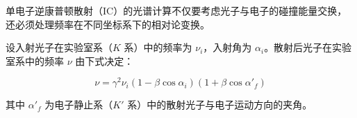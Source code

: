 单电子逆康普顿散射（IC）的光谱计算不仅要考虑光子与电子的碰撞能量交换，还必须处理频率在不同坐标系下的相对论变换。

\begin{theorem}[逆康普顿散射频率变换]
设入射光子在实验室系（$K$ 系）中的频率为 $\nu_i$，入射角为 $\alpha_i$。散射后光子在实验室系中的频率 $\nu$ 由下式决定：
\begin{tcolorbox}[colframe=black, colback=white, boxrule=0.5pt, arc=0pt]
\begin{equation}
    \nu = \gamma^2 \nu_i (1 - \beta \cos \alpha_i)(1 + \beta \cos \alpha'_f)
\end{equation}
\end{tcolorbox}
其中 $\alpha'_f$ 为电子静止系（$K'$ 系）中的散射光子与电子运动方向的夹角。
\end{theorem}


